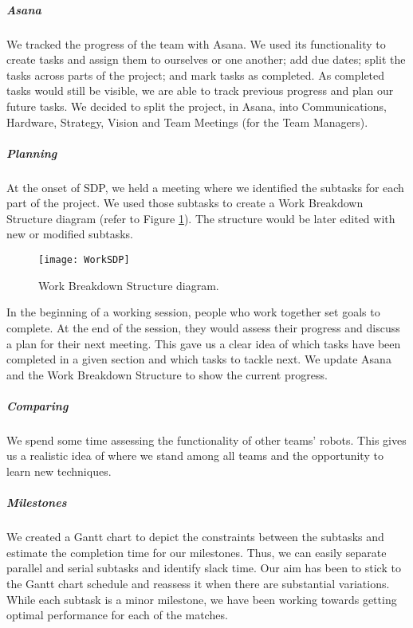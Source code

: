 \subparagraph{Asana}
We tracked the progress of the team with Asana. We used its functionality to create tasks and assign them to ourselves or one another; add due dates; split the tasks across parts of the project; and mark tasks as completed. As completed tasks would still be visible, we are able to track previous progress and plan our future tasks. We decided to split the project, in Asana, into Communications, Hardware, Strategy, Vision and Team Meetings (for the Team Managers).

\subparagraph{Planning}
At the onset of SDP, we held a meeting where we identified the subtasks for each part of the project. We used those subtasks to create a Work Breakdown Structure diagram (refer to Figure \ref{fig:diagram}). The structure would be later edited with new or modified subtasks.

\begin{figure}[H]
    \centering
    \texttt{[image: WorkSDP]}
    \caption{Work Breakdown Structure diagram.}
    \label{fig:diagram}
\end{figure}

In the beginning of a working session, people who work together set goals to complete. At the end of the session, they would assess their progress and discuss a plan for their next meeting. This gave us a clear idea of which tasks have been completed in a given section and which tasks to tackle next. We update Asana and the Work Breakdown Structure to show the current progress.

\subparagraph{Comparing}
We spend some time assessing the functionality of other teams' robots. This gives us a realistic idea of where we stand among all teams and the opportunity to learn new techniques.

\subparagraph{Milestones}
We created a Gantt chart to depict the constraints between the subtasks and estimate the completion time for our milestones. Thus, we can easily separate parallel and serial subtasks and identify slack time. Our aim has been to stick to the Gantt chart schedule and reassess it when there are substantial variations. While each subtask is a minor milestone, we have been working towards getting optimal performance for each of the matches.
